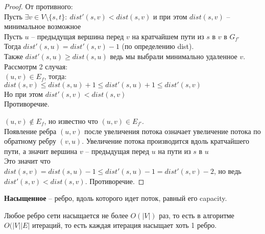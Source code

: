 \begin{proof} От противного: \\
	Пусть $\exists v \in V \setminus \{s, t\}:\ dist'(s, v) < dist(s, v)$ и при этом $dist(s, v)$ -- минимальное возможное \\
	Пусть $u$ -- предыдущая вершина перед  $v$	на кратчайшем пути из $s$ в  $v$ в $G_{f'}$ \\
	Тогда $dist'(s, u) = dist'(s, v) - 1$ (по определению dist). \\
	Также $dist'(s,u) \geq dist(s, u)$ ведь мы выбрали минимально удаленное $v$.\\
	Рассмотрм 2 случая: \\
		$(u, v) \in E_f$, тогда: \\
			$dist(s, v) \leq dist(s, u) + 1 \leq dist'(s, u) + 1 \leq dist'(s, v)$ \\
			Но при этом $dist'(s, v) < dist(s, v)$ \\
			Противоречие.
		
			$(u, v) \notin E_f$, но известно что $(u, v) \in E_{f'}$.\\
			Появление ребра $(u,v)$ после увеличения потока означает увеличение потока по обратному ребру $(v,u)$. Увеличение потока производится вдоль кратчайшего пути, а значит вершина  $v$ -- предыдущая перед  $u$ на пути из  $s$ в  $u$\\
			Это значит что  $dist(s, v) = dist(s, u) - 1 \leq dist'(s, u) - 1 = dist'(s, v) - 2$, но ведь $dist'(s, v) < dist(s, v)$. Противоречие.

\end{proof}

\begin{Def}
	\textbf{Насыщенное} -- ребро, вдоль которого идет поток, равный его capacity.
\end{Def}

\begin{lemma}
	Любое ребро сети насыщается не более $O(\lvert V \rvert)$ раз, то есть в алгоритме $O(\lvert V \rvert \lvert E \rvert$ итераций, то есть каждая итерация насыщает хоть 1 ребро.
\end{lemma}


